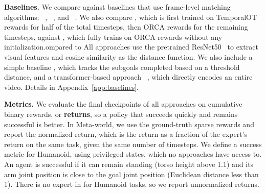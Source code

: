\textbf{Baselines.} We compare \ours{} against baselines that use frame-level matching algorithms: \ot{}~\cite{tian2024what}, \tot{}~\cite{fu2024robot}, and \dtw{}~\cite{dtw}. 
We also compare \orca{}, which is first trained on TemporalOT rewards for half of the total timesteps, then ORCA rewards for the remaining timesteps, against \orcanp{}, which fully trains on ORCA rewards without any initialization.ompared to 
All approaches use the pretrained ResNet50~\cite{he2015deepresiduallearningimage} to extract visual features and cosine similarity as the distance function. 
We also include a simple baseline \threshold{}, which tracks the subgoals completed based on a threshold distance, and a transformer-based approach \roboclip{}~\citep{sontakke2024roboclip}, which directly encodes an entire video.
Details in Appendix~\ref{app:baselines}.

\textbf{Metrics.} We evaluate the final checkpoints of all approaches on cumulative binary rewards, or \textbf{returns}, so a policy that succeeds quickly and remains successful is better.
In Meta-world, we use the ground-truth sparse rewards and report the normalized return, which is the return as a fraction of the expert's return on the same task, given the same number of timesteps.
We define a success metric for Humanoid, using privileged states, which no approaches have access to.
An agent is successful if it can remain standing (torso height above 1.1) and its arm joint position is close to the goal joint position (Euclidean distance less than 1). There is no expert in for Humanoid tasks, so we report unnormalized returns.
